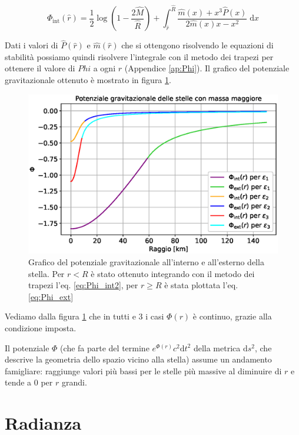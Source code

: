 \documentclass[a4paper, titlepage]{article}
\begin{document}
\begin{equation}
    \Phi_\text{int} (\hat r) =
    \frac{1}{2} \log(1 - \frac{2 \hat{M}}{\hat R}) + \int_{\hat r}^{\hat R} \frac{\hat m (x) + x^3 \hat P (x)}{2 \hat m (x) x - x^2}  \;\mathrm{d}x
    \label{eq:Phi_int2}
\end{equation}

Dati i valori di $\hat P (\hat r)$ e $\hat m (\hat r)$ che si ottengono risolvendo le equazioni di stabilità possiamo quindi risolvere l'integrale con il metodo dei trapezi per ottenere il valore di $Phi$ a ogni $r$ (Appendice \ref{ap:Phi}). Il grafico del potenziale gravitazionale ottenuto è mostrato in figura \ref{fig:Phi}.

\begin{figure}[h]
    \centering
    \includegraphics[width = \textwidth]{Figures/Phi.eps}
    \caption{Grafico del potenziale gravitazionale all'interno e all'esterno della stella. Per $r < R$ è stato ottenuto integrando con il metodo dei trapezi l'eq. \ref{eq:Phi_int2}, per $r \geq R$ è stata plottata l'eq. \ref{eq:Phi_ext}}
    \label{fig:Phi}
\end{figure}

Vediamo dalla figura \ref{fig:Phi} che in tutti e 3 i casi $\Phi (r)$ è continuo, grazie alla condizione imposta.

Il potenziale $\Phi$ (che fa parte del termine $e^{\Phi (r)} c^2 \mathrm{d}t^2$ della metrica $\mathrm{d}s^2$, che descrive la geometria dello spazio vicino alla stella) assume un andamento famigliare: raggiunge valori più bassi per le stelle più massive al diminuire di $r$ e tende a 0 per $r$ grandi.



\section{Radianza} \label{sec:rad}
\end{document}
